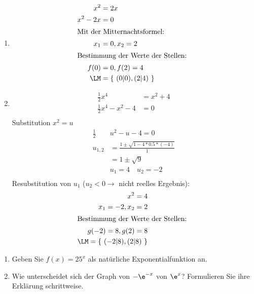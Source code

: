\begin{lsg}{}
  \begin{multicols}{2}
    \begin{enumerate}
      \item \begin{align*}
        x^2 &= 2x\\
        x^2-2x &= 0\\
        \intertext{Mit der Mitternachtsformel: }
        x_1 &= 0, x_2 =2\\
        \intertext{Bestimmung der Werte der Stellen: }
        f(0) &= 0, f(2) = 4\\
        \LM &= \left\{\ (0|0),(2|4) \ \right\}
      \end{align*}

      \columnbreak
      \item
      \begin{align*}
        \frac 1 2 x^4 &= x^2+4\\
        \frac 1 2 x^4 -x^2 -4 &= 0\\
      \end{align*}
      Substitution $x^2=u$
      \begin{align*}
        \frac 1 2& u^2 -u -4 = 0\\
        u_{1,2}&=\frac{1\pm\sqrt{1-4*0.5*(-4)}}{1}\\
        &= 1\pm\sqrt{9}\\
        &u_1 = 4\quad u_2=-2\\
      \end{align*}
      Resubstitution von $u_1$ ($u_2 < 0 \rightarrow $ nicht reelles Ergebnis):
      \begin{align*}
        x^2=4\\
        x_1 = -2, x_2 = 2\\
        \intertext{Bestimmung der Werte der Stellen: }
        g(-2)=8, g(2)=8\\
        \LM = \left\{\ (-2|8),(2|8) \ \right\}
      \end{align*}
    \end{enumerate}
  \end{multicols}
\end{lsg}

\begin{enumerate}
	\item Geben Sie $f(x)=25^x$ als natürliche Exponentialfunktion an.
	\item	Wie unterscheidet sich der Graph von $-\e^{-x}$ von $\e^x$? Formulieren Sie ihre Erklärung schrittweise.
\end{enumerate}



